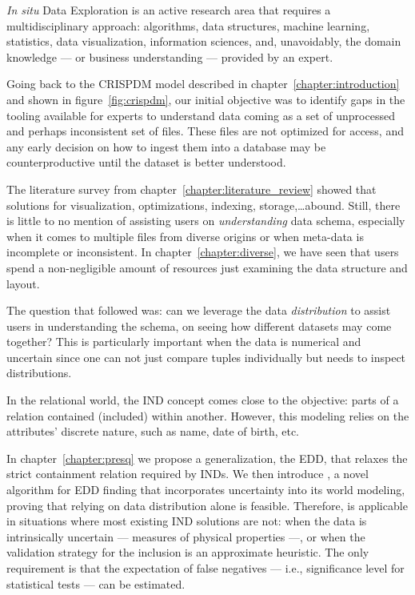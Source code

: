 \glsresetall

\emph{In situ} Data Exploration is an active research area that requires
a multidisciplinary approach: algorithms, data structures, machine learning,
statistics,  data visualization, information sciences, and, unavoidably,
the domain knowledge --- or business understanding ---  provided by an expert.

Going back to the \gls{CRISPDM} model described in  chapter~\ref{chapter:introduction}
and shown in figure~\ref{fig:crispdm}, our initial objective was to identify
gaps in the tooling available for experts to understand data coming as a set of
unprocessed and perhaps inconsistent set of files. These files are not optimized
for access, and any early decision on how to ingest them into a database may be
counterproductive until the dataset is better understood.

The literature survey from chapter~\ref{chapter:literature_review} showed that
solutions for visualization, optimizations, indexing, storage,\ldots abound.
Still, there is little to no mention of assisting users on \emph{understanding}
data schema, especially when it comes to multiple files from diverse origins or
when meta-data is incomplete or inconsistent.
In chapter~\ref{chapter:diverse}, we have seen that users spend a non-negligible
amount of resources just examining the data structure and layout.

The question that followed was: can we leverage the data \emph{distribution} to
assist users in understanding the schema, on seeing how different datasets may come together?
This is particularly important when the data is numerical and uncertain since
one can not just compare tuples individually but needs to inspect distributions.

In the relational world, the \gls{IND} concept comes close to the objective:
parts of a relation contained (included) within another. However, this modeling
relies on the attributes' discrete nature, such as name, date of birth, etc.

In chapter~\ref{chapter:presq} we propose a generalization, the \gls{EDD}, that
relaxes the strict containment relation required by \glspl{IND}.
We then introduce \PresQ, a novel algorithm for \gls{EDD} finding that incorporates
uncertainty into its world modeling, proving that relying on data distribution alone is feasible.
Therefore, \PresQ is applicable in situations where most existing \gls{IND} solutions
are not: when the data is intrinsically uncertain --- measures of physical properties ---,
or when the validation strategy for the inclusion is an approximate heuristic.
The only requirement is that the expectation of false negatives --- i.e., significance
level for statistical tests --- can be estimated.

